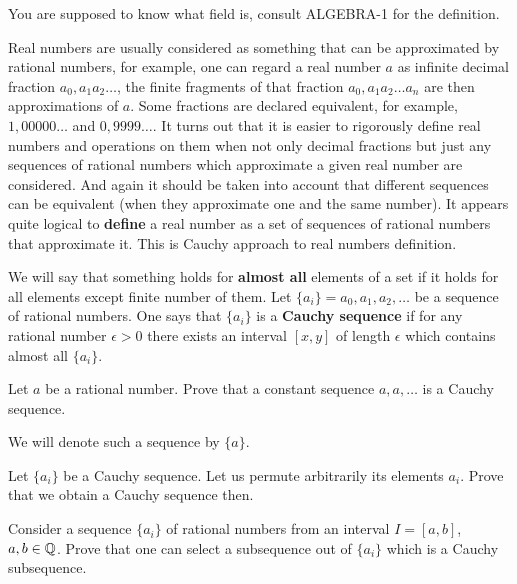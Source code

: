 \documentclass[12pt]{article}
\begin{document}


You are supposed to know what field is, consult ALGEBRA-1 for the
definition.


Real numbers are usually considered as something that can be
approximated by rational numbers, for example, one can regard a real
number $a$ as infinite decimal fraction $a_0,a_1a_2\dots$, the finite
fragments of that fraction $a_0,a_1a_2 \dots a_n$ are then
approximations of $a$. Some fractions are declared equivalent, for
example, $1,00000\dots$ and $0,9999 \dots$. It turns out that it is
easier to rigorously define real numbers and operations on them when
not only decimal fractions but just any sequences of rational numbers
which approximate a given real number are considered. And again it
should be taken into account that different sequences can be
equivalent (when they approximate one and the same number). It appears
quite logical to {\bf define} a real number as a set of sequences of
rational numbers that approximate it. This is Cauchy approach to
real numbers definition.

\begin{opredelenie} We will say that something holds for {\bf almost
    all} elements of a set if it holds for all elements except finite
number of them. Let $\{a_i\}= a_0, a_1, a_2, \ldots$ be a sequence of
rational numbers. One says that $\{a_i\}$ is a {\bf Cauchy sequence}
if for any rational number $\epsilon >0$ there exists an interval $[x,
y]$ of length $\epsilon$ which contains almost all $\{a_i\}$.
\end{opredelenie}

\begin{zadacha}
Let $a$ be a rational number. Prove that a constant sequence
$a,a,\dots$ is a Cauchy sequence.
\end{zadacha}

We will denote such a sequence by $\{a\}$.

\begin{zadacha} Let $\{a_i\}$ be a Cauchy sequence. Let us permute
  arbitrarily its elements $a_i$. Prove that we obtain a Cauchy
  sequence then.
\end{zadacha}

\begin{zadacha} Consider a sequence $\{a_i\}$ of rational numbers from
  an interval $I = [a, b]$, $a, b \in {\mathbb Q}$. Prove that one can select a
  subsequence out of $\{a_i\}$ which is a Cauchy subsequence.
\end{zadacha}
\end{document}
